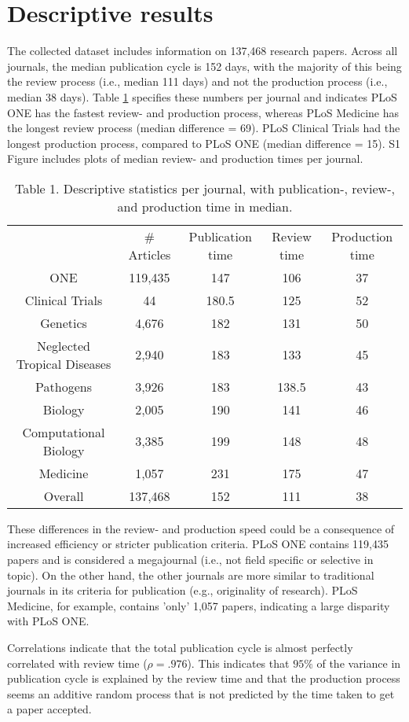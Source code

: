 \section*{Descriptive results}
The collected dataset includes information on 137,468 research papers. Across all journals, the median publication cycle is 152 days, with the majority of this being the review process (i.e., median 111 days) and not the production process (i.e., median 38 days). Table \ref{tab:tab1} specifies these numbers per journal and indicates PLoS ONE has the fastest review- and production process, whereas PLoS Medicine has the longest review process (median difference = 69). PLoS Clinical Trials had the longest production process, compared to PLoS ONE (median difference = 15). S1 Figure includes plots of median review- and production times per journal. 

\begin{table}
\caption{Table 1. Descriptive statistics per journal, with publication-, review-, and production time in median.}
\label{tab:tab1}
\begin{tabular}{ c c c c c }
          & \# Articles & Publication time & Review time & Production time \\
    ONE   & 119,435 & 147   & 106   & 37 \\
    Clinical Trials & 44    & 180.5 & 125   & 52 \\
    Genetics & 4,676  & 182   & 131   & 50 \\
    Neglected Tropical Diseases & 2,940  & 183   & 133   & 45 \\
    Pathogens & 3,926  & 183   & 138.5 & 43 \\
    Biology & 2,005  & 190   & 141   & 46 \\
    Computational Biology & 3,385  & 199   & 148   & 48 \\
    Medicine & 1,057  & 231   & 175   & 47 \\
    Overall & 137,468 & 152   & 111   & 38 \\
\end{tabular}
\end{table}

These differences in the review- and production speed could be a consequence of increased efficiency or stricter publication criteria. PLoS ONE contains 119,435 papers and is considered a megajournal (i.e., not field specific or selective in topic). On the other hand, the other journals are more similar to traditional journals in its criteria for publication (e.g., originality of research). PLoS Medicine, for example, contains 'only' 1,057 papers, indicating a large disparity with PLoS ONE. 

Correlations indicate that the total publication cycle is almost perfectly correlated with review time ($\rho=.976$). This indicates that $95\%$ of the variance in publication cycle is explained by the review time and that the production process seems an additive random process that is not predicted by the time taken to get a paper accepted.